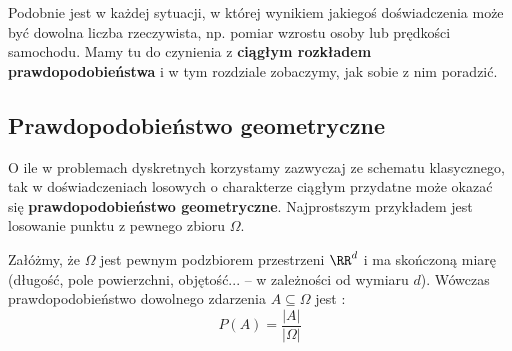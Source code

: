 Podobnie jest w każdej sytuacji, w której wynikiem jakiegoś doświadczenia może być dowolna liczba rzeczywista, np. pomiar wzrostu osoby lub prędkości samochodu. Mamy tu do czynienia z \textbf{ciągłym rozkładem prawdopodobieństwa} i w tym rozdziale zobaczymy, jak sobie z nim poradzić.

\subsection{Prawdopodobieństwo geometryczne}

O ile w problemach dyskretnych korzystamy zazwyczaj ze schematu klasycznego, tak w doświadczeniach losowych o charakterze ciągłym przydatne może okazać się \textbf{prawdopodobieństwo geometryczne}. Najprostszym przykładem jest losowanie punktu z pewnego zbioru $\Omega$.

Załóżmy, że $\Omega$ jest pewnym podzbiorem przestrzeni $\RR^d$ i ma skończoną miarę (długość, pole powierzchni, objętość... -- w zależności od wymiaru $d$). Wówczas prawdopodobieństwo dowolnego zdarzenia $A \subseteq \Omega$ jest :
$$P(A) = \frac{|A|}{|\Omega|}$$


